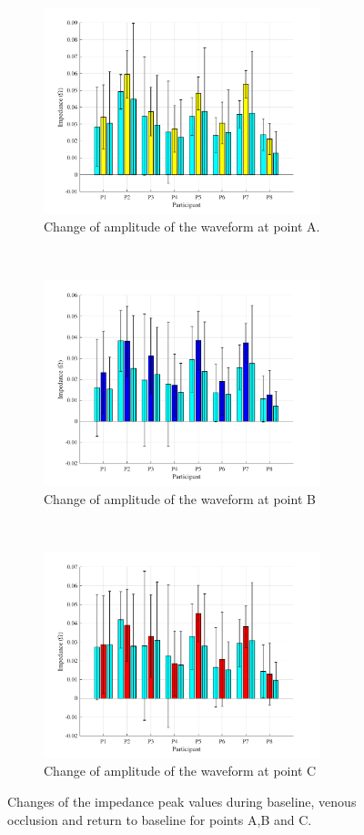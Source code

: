 \begin{figure}[t!]
	\centering
	\begin{subfigure}[t]{0.5\textwidth}
	\centering
		\includegraphics[height=6cm,keepaspectratio]{figure7a}    
		\caption{Change of amplitude of the waveform at point A.}
		\label{fig:change_A_venous}
	\end{subfigure}%
	~ 
	\begin{subfigure}[t]{0.5\textwidth}
		\centering
		\includegraphics[height=6cm,keepaspectratio,keepaspectratio]{figure7b}    
		\caption{Change of amplitude of the waveform at point B}
		\label{fig:change_B_venous}
	\end{subfigure}
	~
	\begin{subfigure}[t]{0.5\textwidth}
		\centering
		\includegraphics[height=6cm,keepaspectratio]{figure7c}    
		\caption{Change of amplitude of the waveform at point C}
		\label{fig:change_C_venous}
\end{subfigure}%
	\caption{Changes of the impedance peak values during baseline, venous occlusion and return to baseline for points A,B and C.}
	\label{fig:iPG_change_points_venous}
\end{figure}

